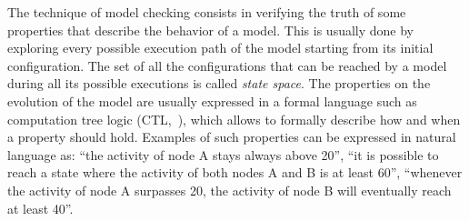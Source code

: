 \documentclass{bmcart}
\begin{document}
The technique of model checking consists in verifying the truth of some properties
that describe the behavior of a model. This is usually done by exploring every
possible execution path of the model starting from its initial configuration. The set of all
the configurations that can be reached by a model during all its possible executions
is called \emph{state space}. The properties on the evolution of the model are
usually expressed in a formal language such as computation tree logic (CTL,~\cite{ctl}),
which allows to formally describe how and when a property should hold. Examples of such
properties can be expressed in natural language as: ``the activity of node A
stays always above 20'', ``it is possible to reach a state where the activity of both nodes A and B
is at least 60'', ``whenever the activity of node A surpasses 20, the activity of node
B will eventually reach at least 40''.
\end{document}
